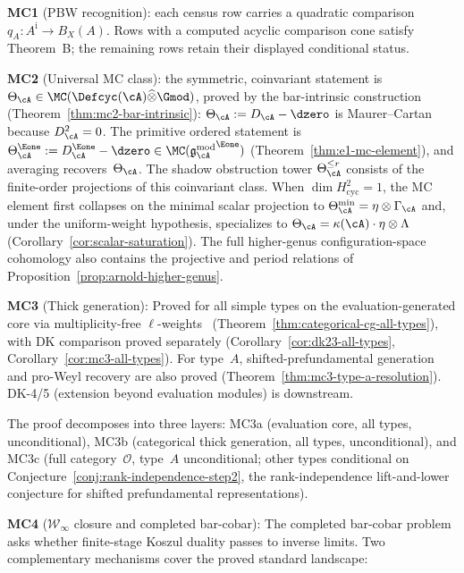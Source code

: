 \noindent\textbf{MC1} (PBW recognition): each census row carries a
quadratic comparison $q_A\colon A^{\mathrm i}\to B_X(A)$.  Rows with
a computed acyclic comparison cone satisfy Theorem~B; the remaining
rows retain their displayed conditional status.

\noindent\textbf{MC2} (Universal MC class): the symmetric, coinvariant statement is
$\Theta_\cA \in \MC(\Defcyc(\cA) \widehat{\otimes} \Gmod)$, proved by
the bar-intrinsic construction
\textup{(}Theorem~\ref{thm:mc2-bar-intrinsic}\textup{)}:
$\Theta_\cA := D_\cA - \dzero$ is Maurer--Cartan because
$D_\cA^2 = 0$. The primitive ordered statement is
$\Theta_\cA^{\Eone} := D_\cA^{\Eone} - \dzero \in
\MC({\gAmod}^{\Eone})$
\textup{(}Theorem~\ref{thm:e1-mc-element}\textup{)}, and averaging
recovers~$\Theta_\cA$. The shadow obstruction tower
$\Theta_\cA^{\leq r}$ consists of the finite-order projections of this
coinvariant class. When $\dim H^2_{\mathrm{cyc}} = 1$, the MC element
first collapses on the minimal scalar projection to
$\Theta_\cA^{\min} = \eta \otimes \Gamma_\cA$ and, under the
uniform-weight hypothesis, specializes to
$\Theta_\cA = \kappa(\cA) \cdot \eta \otimes \Lambda$
\textup{(}Corollary~\ref{cor:scalar-saturation}\textup{)}. The full
higher-genus configuration-space cohomology also contains the
projective and period relations of
Proposition~\ref{prop:arnold-higher-genus}.

\noindent\textbf{MC3} (Thick generation): Proved for all simple types on the evaluation-generated core via multiplicity-free $\ell$-weights~\cite{ChariMoura06} (Theorem~\ref{thm:categorical-cg-all-types}), with DK comparison proved separately (Corollary~\ref{cor:dk23-all-types}, Corollary~\ref{cor:mc3-all-types}). For type~$A$, shifted-prefundamental generation and pro-Weyl recovery are also proved (Theorem~\ref{thm:mc3-type-a-resolution}). DK-4/5 (extension beyond evaluation modules) is downstream.

 The proof decomposes into three layers: MC3a (evaluation core, all types, unconditional), MC3b (categorical thick generation, all types, unconditional), and MC3c (full category~$\mathcal{O}$, type~$A$ unconditional; other types conditional on Conjecture~\ref{conj:rank-independence-step2}, the rank-independence lift-and-lower conjecture for shifted prefundamental representations).

\noindent\textbf{MC4} ($\mathcal{W}_\infty$ closure and completed bar-cobar): The completed bar-cobar problem asks whether finite-stage Koszul duality passes to inverse limits. Two complementary mechanisms cover the proved standard landscape:

